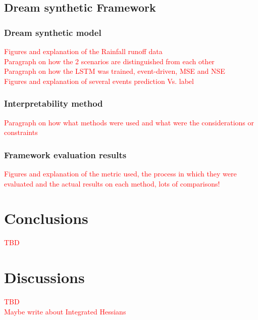 \documentclass[12pt]{report}
\begin{document}
\section{Dream synthetic Framework}
\subsection{Dream synthetic model}
\textcolor{red}{Figures and explanation of the Rainfall runoff data}\\

\textcolor{red}{Paragraph on how the 2 scenarios are distinguished from each other }\\

\textcolor{red}{Paragraph on how the LSTM was trained, event-driven, MSE and NSE}\\

\textcolor{red}{Figures and explanation of several events prediction Vs. label}\\
\subsection{Interpretability method}

\textcolor{red}{Paragraph on how what methods were used and what were the considerations or constraints}\\

\subsection{Framework evaluation results}
\textcolor{red}{Figures and explanation of the metric used, the process in which they were evaluated and the actual results on each method, lots of comparisons!}\\

\chapter{Conclusions} 
\textcolor{red}{TBD}\\
\chapter{Discussions} 


\textcolor{red}{TBD}\\
\textcolor{red}{Maybe write about Integrated Hessians}	 \cite{DBLP:journals/corr/abs-2002-04138}

\newpage

%




	

\printbibliography
\end{document}
